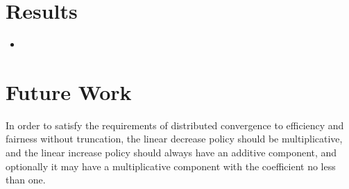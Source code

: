 \documentclass[a4paper]{article}
\begin{document}
    \section{Results}
    \begin{itemize}
      \item
    \end{itemize}
    
    
    \section{Future Work}
    In order to satisfy the requirements of distributed convergence to efficiency and fairness without truncation, the linear decrease policy should be multiplicative, and the linear increase policy should always 
have an additive component, and optionally it may have a multiplicative component with the coefficient no less than one.  
    
    
    
\end{document}

